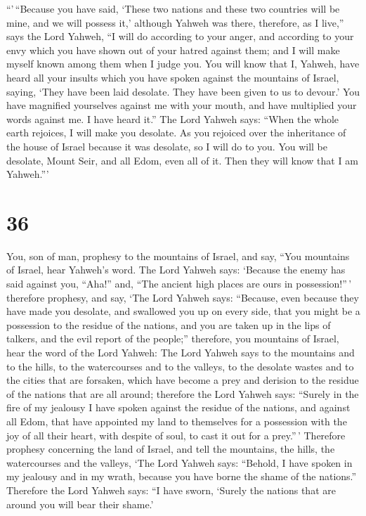  ``'\,``Because you have said, `These two nations and
these two countries will be mine, and we will possess it,' although
Yahweh was there,  therefore, as I live,'' says the Lord
Yahweh, ``I will do according to your anger, and according to your envy
which you have shown out of your hatred against them; and I will make
myself known among them when I judge you.  You will know
that I, Yahweh, have heard all your insults which you have spoken
against the mountains of Israel, saying, `They have been laid desolate.
They have been given to us to devour.'  You have
magnified yourselves against me with your mouth, and have multiplied
your words against me. I have heard it.''  The Lord
Yahweh says: ``When the whole earth rejoices, I will make you desolate.
 As you rejoiced over the inheritance of the house of
Israel because it was desolate, so I will do to you. You will be
desolate, Mount Seir, and all Edom, even all of it. Then they will know
that I am Yahweh.'''

\hypertarget{section-34}{%
\section{36}\label{section-34}}

 You, son of man, prophesy to the mountains of Israel, and
say, ``You mountains of Israel, hear Yahweh's word.  The
Lord Yahweh says: `Because the enemy has said against you, ``Aha!'' and,
``The ancient high places are ours in possession!''\,' 
therefore prophesy, and say, `The Lord Yahweh says: ``Because, even
because they have made you desolate, and swallowed you up on every side,
that you might be a possession to the residue of the nations, and you
are taken up in the lips of talkers, and the evil report of the
people;''  therefore, you mountains of Israel, hear the
word of the Lord Yahweh: The Lord Yahweh says to the mountains and to
the hills, to the watercourses and to the valleys, to the desolate
wastes and to the cities that are forsaken, which have become a prey and
derision to the residue of the nations that are all around;
 therefore the Lord Yahweh says: ``Surely in the fire of
my jealousy I have spoken against the residue of the nations, and
against all Edom, that have appointed my land to themselves for a
possession with the joy of all their heart, with despite of soul, to
cast it out for a prey.''\,'  Therefore prophesy
concerning the land of Israel, and tell the mountains, the hills, the
watercourses and the valleys, `The Lord Yahweh says: ``Behold, I have
spoken in my jealousy and in my wrath, because you have borne the shame
of the nations.''  Therefore the Lord Yahweh says: ``I
have sworn, `Surely the nations that are around you will bear their
shame.'

